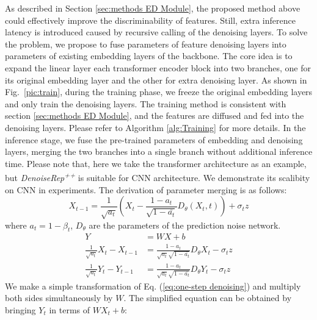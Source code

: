 \documentclass[conference]{IEEEtran}
\begin{document}
{\label{sec:method RD Plugin}
As described in Section \ref{sec:methods ED Module}, the proposed method above could effectively improve the discriminability of features. Still, extra inference latency is introduced caused by recursive calling of the denoising layers.
%
To solve the problem, we propose to fuse parameters of feature denoising layers into parameters of existing embedding layers of the backbone. The core idea is to expand the linear layer each transformer encoder block into two branches, one for its original embedding layer and the other for extra denoising layer. As shown in Fig.~\ref{pic:train}, during the training phase, we freeze the original embedding layers and only train the denoising layers. The training method is consistent with section \ref{sec:methods ED Module}, and the features are diffused and fed into the denoising layers. Please refer to Algorithm \ref{alg:Training} for more details. In the inference stage, we fuse the pre-trained parameters of embedding and denoising layers, merging the two branches into a single branch without additional inference time. 
%
Please note that, here we take the transformer architecture as an example, but \textit{DenoiseRep\textsuperscript{++}} is suitable for CNN architecture. We demonstrate its scalibity on CNN in experiments.
%
The derivation of parameter merging is as follows:
\begin{equation}
X_{t-1} =\frac{1}{\sqrt{a_t} } (X_t - \frac{1-a_t}{\sqrt{1 - \bar{a_t} } } D_\theta(X_t, t))+\sigma_tz \label{eq:one-step denoising}
\end{equation}
where $a_t = 1- \beta_t$, $D_\theta$ are the parameters of the prediction noise network.
\begin{equation}
\begin{aligned}
     Y &= WX + b \\
     \frac{1}{\sqrt{a_t} }X_t - X_{t-1} &= \frac{1-a_t}{\sqrt{a_t}\sqrt{1-\bar{a_t} }  }D_\theta X_t-\sigma_tz   \\
     \frac{1}{\sqrt{a_t} }Y_t - Y_{t-1} &= \frac{1-a_t}{\sqrt{a_t}\sqrt{1-\bar{a_t} }  }D_\theta Y_t-\sigma_tz 
\end{aligned}
\label{eq:One-step denoising (transform)}
\end{equation}
We make a simple transformation of Eq. (\ref{eq:one-step denoising}) and multiply both sides simultaneously by $W$.
The simplified equation can be obtained by bringing $Y_t$ in terms of $WX_t + b$:
}
\end{document}
